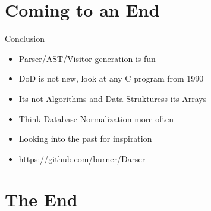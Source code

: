 \documentclass[aspectratio=169,notes]{beamer}
\begin{document}
	\section{Coming to an End}
	\begin{frame}[fragile]{Conclusion}
		\begin{itemize}
			\item Parser/AST/Visitor generation is fun
			\item DoD is not new, look at any C program from 1990
			\item Its not Algorithms and Data-Strukturess its Arrays
			\item Think Database-Normalization more often
			\item Looking into the past for inspiration
			\vfill{}
			\item \url{https://github.com/burner/Darser}
		\end{itemize}
	\end{frame}

	\section{The End}
\end{document}
